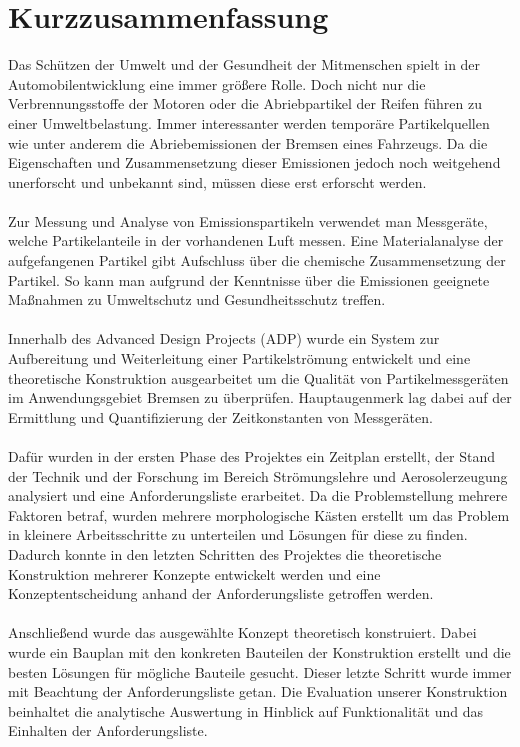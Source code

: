 \section*{Kurzzusammenfassung}
Das Sch\"{u}tzen der Umwelt und der Gesundheit der Mitmenschen spielt in der Automobilentwicklung eine immer gr\"{o}{\ss}ere Rolle. Doch nicht nur die Verbrennungsstoffe der Motoren oder die Abriebpartikel der Reifen f\"{u}hren zu einer Umweltbelastung. Immer interessanter werden tempor\"{a}re Partikelquellen wie unter anderem die Abriebemissionen der Bremsen eines Fahrzeugs. Da die Eigenschaften und Zusammensetzung dieser Emissionen jedoch noch weitgehend unerforscht und unbekannt sind, m\"{u}ssen diese erst erforscht werden. 
\\\\
Zur Messung und Analyse von Emissionspartikeln verwendet man Messger\"{a}te, welche Partikelanteile in der vorhandenen Luft messen. Eine Materialanalyse der aufgefangenen Partikel gibt Aufschluss \"{u}ber die chemische Zusammensetzung der Partikel. So kann man aufgrund der Kenntnisse \"{u}ber die Emissionen geeignete Ma{\ss}nahmen zu Umweltschutz und Gesundheitsschutz treffen.
\\\\
Innerhalb des Advanced Design Projects (ADP) wurde ein System zur Aufbereitung und Weiterleitung einer Partikelstr\"{o}mung entwickelt und eine theoretische Konstruktion ausgearbeitet um die Qualit\"{a}t von Partikelmessger\"{a}ten im Anwendungsgebiet Bremsen zu \"{u}berpr\"{u}fen. Hauptaugenmerk lag dabei auf der Ermittlung und Quantifizierung der Zeitkonstanten von Messger\"{a}ten.
\\\\
Daf\"{u}r wurden in der ersten Phase des Projektes ein Zeitplan erstellt, der Stand der Technik und der Forschung im Bereich Str\"{o}mungslehre und Aerosolerzeugung analysiert und eine Anforderungsliste erarbeitet. Da die Problemstellung mehrere Faktoren betraf, wurden mehrere morphologische K\"{a}sten erstellt um das Problem in kleinere Arbeitsschritte zu unterteilen und L\"{o}sungen f\"{u}r diese zu finden. Dadurch konnte in den letzten Schritten des Projektes die theoretische Konstruktion mehrerer Konzepte entwickelt werden und eine Konzeptentscheidung anhand der Anforderungsliste getroffen werden.
\\\\
Anschlie{\ss}end wurde das ausgew\"{a}hlte Konzept theoretisch konstruiert. Dabei wurde ein Bauplan mit den konkreten Bauteilen der Konstruktion erstellt und die besten L\"{o}sungen f\"{u}r m\"{o}gliche Bauteile gesucht. Dieser letzte Schritt wurde immer mit Beachtung der Anforderungsliste getan. Die Evaluation unserer Konstruktion beinhaltet die analytische Auswertung in Hinblick auf Funktionalit\"{a}t und das Einhalten der Anforderungsliste.